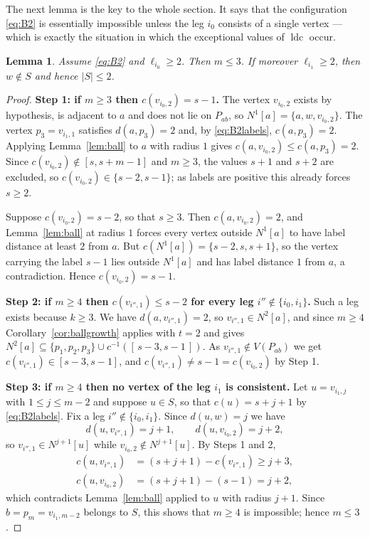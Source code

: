 \documentclass[reqno,10pt]{article}
\newtheorem{lemma}[theorem]{Lemma}
\theoremstyle{definition}
\numberwithin{equation}{section}
\numberwithin{theorem}{section}
\newcommand{\ldc}{\operatorname{ldc}}
\newcommand{\Ball}[2]{N^{#2}[#1]}
\begin{document}
The next lemma is the key to the whole section. It says that the configuration
\eqref{eq:B2} is essentially impossible unless the leg $i_0$ consists of a
single vertex --- which is exactly the situation in which the exceptional values
of $\ldc$ occur.

\begin{lemma}
\label{lem:B2}
Assume \eqref{eq:B2} and $\ell_{i_0}\ge2$. Then $m\le3$. If moreover
$\ell_{i_1}\ge2$, then $w\notin S$ and hence $|S|\le2$.
\end{lemma}

\begin{proof}
\textbf{Step 1: if $m\ge3$ then $c(v_{i_0,2})=s-1$.}
The vertex $v_{i_0,2}$ exists by hypothesis, is adjacent to $a$ and does not lie
on $P_{ab}$, so $\Ball{a}{1}=\{a,w,v_{i_0,2}\}$. The vertex $p_3=v_{i_1,1}$
satisfies $d(a,p_3)=2$ and, by \eqref{eq:B2labels}, $c(a,p_3)=2$. Applying
Lemma~\ref{lem:ball} to $a$ with radius $1$ gives $c(a,v_{i_0,2})\le
c(a,p_3)=2$. Since $c(v_{i_0,2})\notin[s,s+m-1]$ and $m\ge3$, the values
$s+1$ and $s+2$ are excluded, so $c(v_{i_0,2})\in\{s-2,s-1\}$; as labels are
positive this already forces $s\ge2$.

Suppose $c(v_{i_0,2})=s-2$, so that $s\ge3$. Then $c(a,v_{i_0,2})=2$, and
Lemma~\ref{lem:ball} at radius $1$ forces every vertex outside $\Ball{a}{1}$ to
have label distance at least $2$ from $a$. But $c(\Ball{a}{1})=\{s-2,s,s+1\}$,
so the vertex carrying the label $s-1$ lies outside $\Ball{a}{1}$ and has label
distance $1$ from $a$, a contradiction. Hence $c(v_{i_0,2})=s-1$.

\medskip
\noindent\textbf{Step 2: if $m\ge4$ then $c(v_{i'',1})\le s-2$ for every leg
$i''\notin\{i_0,i_1\}$.}
Such a leg exists because $k\ge3$. We have $d(a,v_{i'',1})=2$, so
$v_{i'',1}\in\Ball{a}{2}$, and since $m\ge4$ Corollary~\ref{cor:ballgrowth}
applies with $t=2$ and gives
$\Ball{a}{2}\subseteq\{p_1,p_2,p_3\}\cup c^{-1}([\,s-3,s-1\,])$. As
$v_{i'',1}\notin V(P_{ab})$ we get $c(v_{i'',1})\in[s-3,s-1]$, and
$c(v_{i'',1})\ne s-1=c(v_{i_0,2})$ by Step 1.

\medskip
\noindent\textbf{Step 3: if $m\ge4$ then no vertex of the leg $i_1$ is
consistent.}
Let $u=v_{i_1,j}$ with $1\le j\le m-2$ and suppose $u\in S$, so that
$c(u)=s+j+1$ by \eqref{eq:B2labels}. Fix a leg $i''\notin\{i_0,i_1\}$. Since
$d(u,w)=j$ we have
\[
  d(u,v_{i'',1})=j+1,\qquad d(u,v_{i_0,2})=j+2,
\]
so $v_{i'',1}\in\Ball{u}{j+1}$ while $v_{i_0,2}\notin\Ball{u}{j+1}$. By Steps 1
and 2,
\[
\begin{aligned}
  c(u,v_{i'',1})&=(s+j+1)-c(v_{i'',1})\ge j+3,\\
  c(u,v_{i_0,2})&=(s+j+1)-(s-1)=j+2,
\end{aligned}
\]
which contradicts Lemma~\ref{lem:ball} applied to $u$ with radius $j+1$. Since
$b=p_m=v_{i_1,m-2}$ belongs to $S$, this shows that $m\ge4$ is impossible;
hence $m\le3$.


\end{proof}
\end{document}
